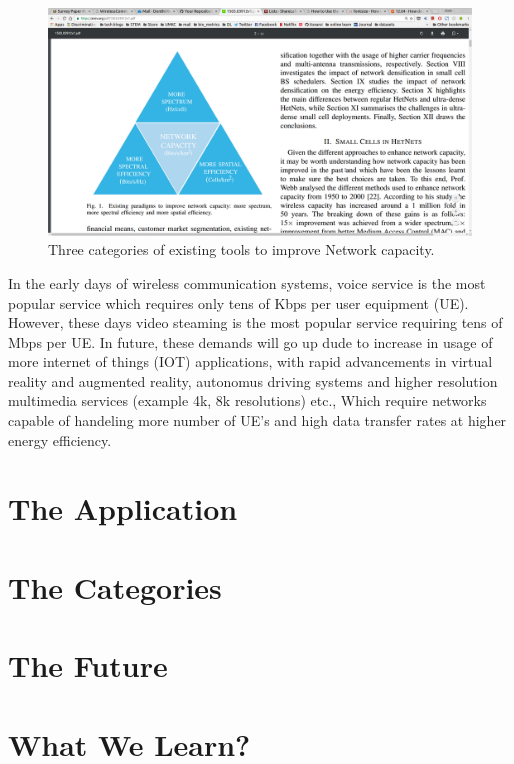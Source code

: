 \documentclass[12pt,conference,onecolumn]{IEEEtran}
\begin{document}
\begin{figure}[ht]
\includegraphics[scale=0.2]{nwcp_class}
\centering
\caption{Three categories of existing tools to improve Network capacity.}
\label{fig:NWCP}
\end{figure}

In the early days of wireless communication systems, voice service is the most popular service which requires only tens of Kbps per user equipment (UE). However, these days video steaming is the most popular service requiring tens of Mbps per UE. In future, these demands will go up dude to increase in usage of more internet of things (IOT) applications, with rapid advancements in virtual reality and augmented reality, autonomus driving systems and higher resolution multimedia services (example 4k, 8k resolutions) etc., Which require networks capable of handeling more number of UE's and high data transfer rates at higher energy efficiency. 



\section{The Application}
\label{sec:TA}

\section{The Categories}
\label{sec:TC}

\section{The Future}
\label{sec:TF}

\section{What We Learn?}
\label{sec:WWL}
\end{document}
